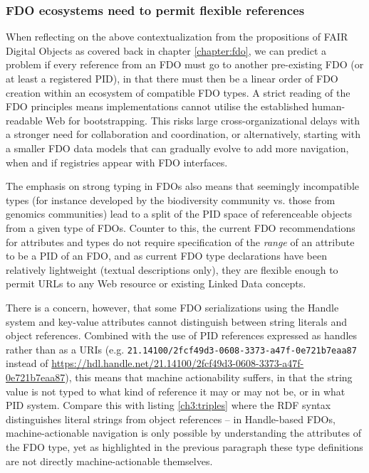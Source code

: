 \subsubsection{FDO ecosystems need to permit flexible references}
\label{ch61:references}

When reflecting on the above contextualization from the propositions of FAIR Digital Objects as covered back in chapter \ref{chapter:fdo}, we can predict a problem if every reference from an FDO must go to another pre-existing FDO (or at least a registered PID), in that there must then be a linear order of FDO creation within an ecosystem of compatible FDO types.
A strict reading of the FDO principles means implementations cannot utilise the established human-readable Web for bootstrapping.
This risks large cross-organizational delays with a stronger need for collaboration and coordination, or alternatively, starting with a smaller FDO data models that can gradually evolve to add more navigation, when and if registries appear with FDO interfaces. 

The emphasis on strong typing in FDOs also means that seemingly incompatible types (for instance developed by the biodiversity community vs. those from genomics communities) lead to a split of the PID space of referenceable objects from a given type of FDOs.  Counter to this, the current FDO recommendations for attributes and types \cite{fdo-ImplAttributesTypesProfiles} do not require specification of the \emph{range} of an attribute to be a PID of an FDO, and as current FDO type declarations have been relatively lightweight (textual descriptions only), they are flexible enough to permit URLs to any Web resource or existing Linked Data concepts.  

There is a concern, however, that some FDO serializations using the Handle system and key-value attributes cannot distinguish between string literals and object references.
Combined with the use of PID references expressed as handles rather than as a URIs (e.g. \texttt{21.14100/2fcf49d3-0608-3373-a47f-0e721b7eaa87} instead of \url{https://hdl.handle.net/21.14100/2fcf49d3-0608-3373-a47f-0e721b7eaa87}), this means that machine actionability suffers, in that the string value is not typed to what kind of reference it may or may not be, or in what PID system. Compare this with listing \vref{ch3:triples} where the RDF syntax distinguishes literal strings from object references -- in Handle-based FDOs, machine-actionable navigation is only possible by understanding the attributes of the FDO type, yet as highlighted in the previous paragraph these type definitions are not directly machine-actionable themselves.

